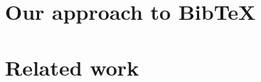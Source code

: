 \documentclass[twoside,11pt,openright,a4paper]{report}
\newcommand{\bibtex}{Bib{\TeX}}
\begin{document}
\chapter{Our approach to {\bibtex}}
\label{ch:approach}


\chapter{Related work}
\label{ch:related}


%



\printbibliography{}
\end{document}
